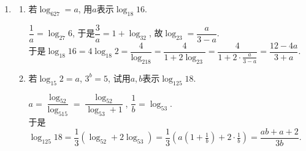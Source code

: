 \begin{enumerate}
\begin{vspace_}
    \vsp[3]
\end{vspace_}


\item 
\begin{enumerate}
\item 若$\log_627=a$, 用$a$表示$\log_{18}16$. 
\begin{jieda}
$\dfrac{1}{a}=\log_{27}6$, 于是$\dfrac{3}{a}=1+\log_32$, 故$\log_23=\dfrac{a}{3-a}$. \\
于是$\log_{18}16=4\log_{18}2=\dfrac{4}{\log_218}=\dfrac{4}{1+2\log_23}=\dfrac{4}{1+2\cdot\frac{a}{3-a}}=\dfrac{12-4a}{3+a}$. 
\end{jieda}

\begin{vspace_}
    \vsp[3]
\end{vspace_}


\item 若$\log_{15}2=a$, $3^b=5$, 试用$a,b$表示$\log_{125}18$. 
\begin{jieda}
$a=\dfrac{\log_52}{\log_515}=\dfrac{\log_52}{\log_53+1}$, $\dfrac{1}{b}=\log_53$. \\
于是$\log_{125}18=\dfrac{1}{3}(\log_52+2\log_53)=\dfrac{1}{3}\left(a(1+\frac{1}{b})+2\cdot\frac{1}{b}\right)=\dfrac{ab+a+2}{3b}$. 
\end{jieda}
\begin{vspace_}
    \vsp[3]
\end{vspace_}
\end{enumerate}

\end{enumerate}

